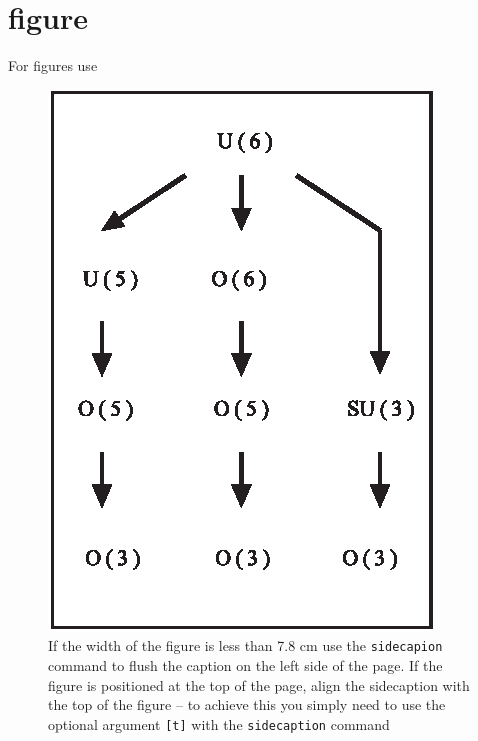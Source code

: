 \section{figure}

For figures use
\begin{figure}[b]
\sidecaption
\includegraphics[scale=.65]{figure}
%
%
\caption{If the width of the figure is less than 7.8 cm use the \texttt{sidecapion} command to flush the caption on the left side of the page. If the figure is positioned at the top of the page, align the sidecaption with the top of the figure -- to achieve this you simply need to use the optional argument \texttt{[t]} with the \texttt{sidecaption} command}
\label{fig:1}       %
\end{figure}


